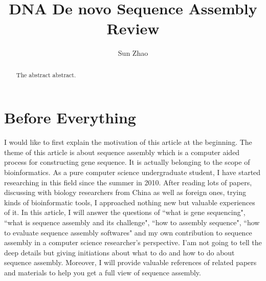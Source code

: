 \documentclass{article}
\title{DNA De novo Sequence Assembly Review}
\author{Sun Zhao}
\begin{document}
\maketitle
\newpage

\begin{abstract}
The abstract abstract.
\end{abstract}

\section{Before Everything}
I would like to first explain the motivation of this article at the beginning. The theme of this article is about sequence assembly which is a computer aided process for constructing gene sequence. It is actually belonging to the scope of bioinformatics. As a pure computer science undergraduate student, I have started researching in this field since the summer in 2010. After reading lots of papers, discussing with biology researchers from China as well as foreign ones, trying kinds of bioinformatic tools, I approached nothing new but valuable experiences of it. In this article, I will answer the questions of ``what is gene sequencing", ``what is sequence assembly and its challenge", ``how to assembly sequence", ``how to evaluate sequence assembly softwares" and my own contribution to sequence assembly in a computer science researcher's perspective. I'am not going to tell the deep details but giving initiations about what to do and how to do about sequence assembly. Moreover, I will provide valuable references of related papers and materials to help you get a full view of sequence assembly.
\end{document}
